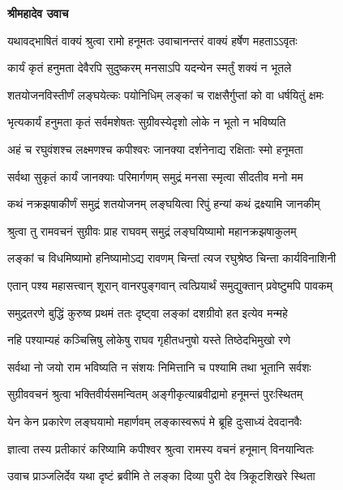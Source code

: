 




\textbf{श्रीमहादेव उवाच}

\twolineshloka
{यथावद्भाषितं वाक्यं श्रुत्वा रामो हनूमतः}
{उवाचानन्तरं वाक्यं हर्षेण महताऽऽवृतः} %

\twolineshloka
{कार्यं कृतं हनुमता देवैरपि सुदुष्करम्}
{मनसाऽपि यदन्येन स्मर्तुं शक्यं न भूतले} %

\twolineshloka
{शतयोजनविस्तीर्णं लङ्घयेत्कः पयोनिधिम्}
{लङ्कां च राक्षसैर्गुप्तां को वा धर्षयितुं क्षमः} %

\twolineshloka
{भृत्यकार्यं हनुमता कृतं सर्वमशेषतः}
{सुग्रीवस्येदृशो लोके न भूतो न भविष्यति} %

\twolineshloka
{अहं च रघुवंशश्च लक्ष्मणश्च कपीश्वरः}
{जानक्या दर्शनेनाद्य रक्षिताः स्मो हनूमता} %

\twolineshloka
{सर्वथा सुकृतं कार्यं जानक्याः परिमार्गणम्}
{समुद्रं मनसा स्मृत्वा सीदतीव मनो मम} %

\twolineshloka
{कथं नक्रझषाकीर्णं समुद्रं शतयोजनम्}
{लङ्घयित्वा रिपुं हन्यां कथं द्रक्ष्यामि जानकीम्} %

\twolineshloka
{श्रुत्वा तु रामवचनं सुग्रीवः प्राह राघवम्}
{समुद्रं लङ्घयिष्यामो महानक्रझषाकुलम्} %

\twolineshloka
{लङ्कां च विधमिष्यामो हनिष्यामोऽद्य रावणम्}
{चिन्तां त्यज रघुश्रेष्ठ चिन्ता कार्यविनाशिनी} %

\twolineshloka
{एतान् पश्य महासत्त्वान् शूरान् वानरपुङ्गवान्}
{त्वत्प्रियार्थं समुद्युक्तान् प्रवेष्टुमपि पावकम्} %

\twolineshloka
{समुद्रतरणे बुद्धिं कुरुष्व प्रथमं ततः}
{दृष्ट्वा लङ्कां दशग्रीवो हत इत्येव मन्महे} %

\twolineshloka
{नहि पश्याम्यहं कञ्चित्त्रिषु लोकेषु राघव}
{गृहीतधनुषो यस्ते तिष्ठेदभिमुखो रणे} %

\twolineshloka
{सर्वथा नो जयो राम भविष्यति न संशयः}
{निमित्तानि च पश्यामि तथा भूतानि सर्वशः} %

\twolineshloka
{सुग्रीववचनं श्रुत्वा भक्तिवीर्यसमन्वितम्}
{अङ्गीकृत्याब्रवीद्रामो हनूमन्तं पुरःस्थितम्} %

\twolineshloka
{येन केन प्रकारेण लङ्घयामो महार्णवम्}
{लङ्कास्वरूपं मे ब्रूहि दुःसाध्यं देवदानवैः} %

\twolineshloka
{ज्ञात्वा तस्य प्रतीकारं करिष्यामि कपीश्वर}
{श्रुत्वा रामस्य वचनं हनूमान् विनयान्वितः} %

\twolineshloka
{उवाच प्राञ्जलिर्देव यथा दृष्टं ब्रवीमि ते}
{लङ्का दिव्या पुरी देव त्रिकूटशिखरे स्थिता} %

